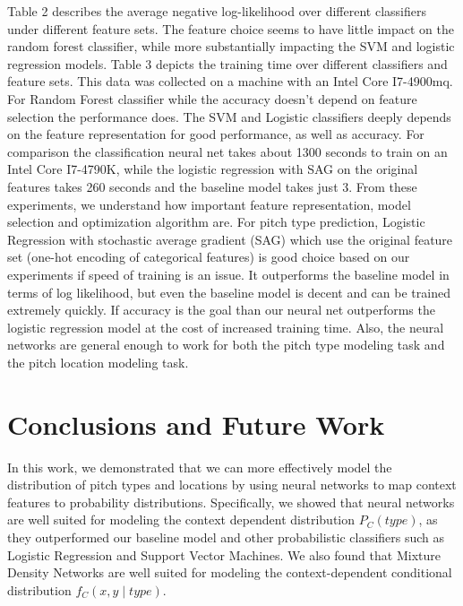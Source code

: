 \documentclass{article}
\begin{document}
Table 2 describes the average negative log-likelihood over different classifiers under different feature sets.  The feature choice seems to have little impact on the random forest classifier, while more substantially impacting the SVM and logistic regression models.
Table 3 depicts the training time over different classifiers and feature sets. This data was collected on a machine with an Intel Core I7-4900mq. For Random Forest classifier while the accuracy doesn't depend on feature selection the performance does. The SVM and Logistic classifiers deeply depends on the feature representation for good performance, as well as accuracy. For comparison the classification neural net takes about 1300 seconds to train on an Intel Core I7-4790K, while the logistic regression with SAG on the original features takes 260 seconds and the baseline model takes just 3. 
From these experiments, we understand how important feature representation, model selection and optimization algorithm are. For pitch type prediction, Logistic Regression with stochastic average gradient (SAG) which use the original feature set (one-hot encoding of categorical features) is good choice based on our experiments if speed of training is an issue.  It outperforms the baseline model in terms of log likelihood, but even the baseline model is decent and can be trained extremely quickly. If accuracy is the goal than our neural net outperforms the logistic regression model at the cost of increased training time.  Also, the neural networks are general enough to work for both the pitch type modeling task and the pitch location modeling task.  

\section{Conclusions and Future Work}

In this work, we demonstrated that we can more effectively model the distribution of pitch types and locations by using neural networks to map context features to probability distributions.  Specifically, we showed that neural networks are well suited for modeling the context dependent distribution $ P_C(type) $, as they outperformed our baseline model and other probabilistic classifiers such as Logistic Regression and Support Vector Machines.  We also found that Mixture Density Networks are well suited for modeling the context-dependent conditional distribution $ f_C(x, y \mid type) $.  
\end{document}
